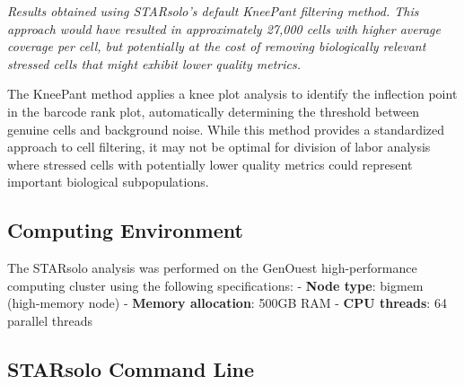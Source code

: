 \documentclass[
  11pt,
  a4paper,
]{report}
\begin{document}
\emph{Results obtained using STARsolo's default KneePant filtering
method. This approach would have resulted in approximately 27,000 cells
with higher average coverage per cell, but potentially at the cost of
removing biologically relevant stressed cells that might exhibit lower
quality metrics.}

The KneePant method applies a knee plot analysis to identify the
inflection point in the barcode rank plot, automatically determining the
threshold between genuine cells and background noise. While this method
provides a standardized approach to cell filtering, it may not be
optimal for division of labor analysis where stressed cells with
potentially lower quality metrics could represent important biological
subpopulations.

\subsection{Computing Environment}\label{computing-environment}

The STARsolo analysis was performed on the GenOuest high-performance
computing cluster using the following specifications: - \textbf{Node
type}: bigmem (high-memory node) - \textbf{Memory allocation}: 500GB RAM
- \textbf{CPU threads}: 64 parallel threads

\subsection{STARsolo Command Line}\label{starsolo-command-line}
\end{document}
